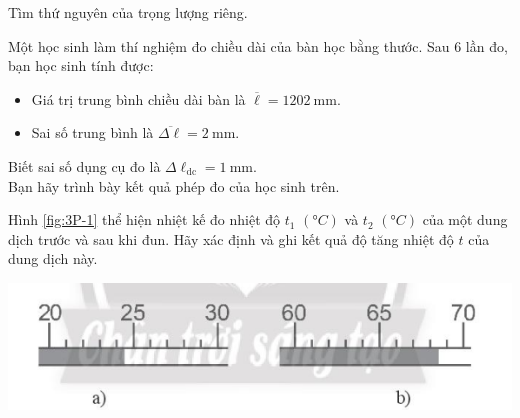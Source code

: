 \begin{ex}
	Tìm thứ nguyên của trọng lượng riêng.
\end{ex}

\begin{ex}
	Một học sinh làm thí nghiệm đo chiều dài của bàn học bằng thước. Sau 6 lần đo, bạn học sinh tính được:
	\begin{itemize}
		\item Giá trị trung bình chiều dài bàn là $\overline{\ell}=\SI{1202}{\milli\meter}$.
		\item Sai số trung bình là $\overline{\Delta\ell}=\SI{2}{\milli\meter}$.
	\end{itemize}
	Biết sai số dụng cụ đo là $\Delta \ell_\text{dc}=\SI{1}{\milli\meter}$.\\
	Bạn hãy trình bày kết quả phép đo của học sinh trên.
\end{ex}

\begin{ex}
	Hình \ref{fig:3P-1} thể hiện nhiệt kế đo nhiệt độ $t_1$ $\left(\si{\degree C}\right)$ và $t_2$ $\left(\si{\degree C}\right)$ của một dung dịch trước và sau khi đun. Hãy xác định và ghi kết quả độ tăng nhiệt độ $t$ của dung dịch này.
	\begin{center}
		\includegraphics[scale=0.5]{figs/G10Y25B2-2}
		\label{fig:3P-1}
	\end{center}
\end{ex}

